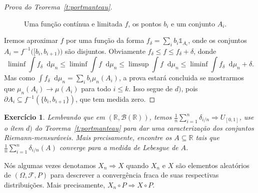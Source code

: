 \documentclass[reqno, final]{book}
\newcommand*\1{\mathds{1}}
\newtheorem{exercise}[example]{Exercício}
\renewcommand*\d{\mathop{}\!\mathrm{d}}
\begin{document}
\begin{proof}[Prova do Teorema~\ref{t:portmanteau}]
  \begin{figure}[!ht]
    \centering
    \caption{Uma função contínua e limitada $f$, os pontos $b_i$ e um conjunto $A_i$.}
  \end{figure}

  Iremos aproximar $f$ por uma função da forma $f_\delta = \sum_{i} b_i \1_{A_i}$, onde os conjuntos $A_i = f^{-1}\big( [b_i, b_{i+1}) \big)$ são disjuntos.
  Obviamente $f_\delta \leq f \leq f_\delta + \delta$, donde
  \begin{equation*}
    \liminf \int f_\delta \d \mu_n \leq \liminf \int f \d \mu_n \leq \limsup \int f \d \mu_n \leq \liminf \int f_\delta \d \mu_n + \delta.
  \end{equation*}
  Mas como $\int f_\delta \d \mu_n = \sum_i b_i \mu_n (A_i)$, a prova estará concluida se mostrarmos que $\mu_n (A_i) \to \mu(A_i)$ para todo $i \leq k$.
  Isso segue de $d)$, pois $\partial A_i \subseteq f^{-1}(\{b_i, b_{i+1}\})$, que tem medida zero.
\end{proof}

\begin{exercise}
  Lembrando que em $(\mathbb{R}, \mathcal{B}(\mathbb{R}))$, temos $\tfrac{1}{n} \sum_{i=1}^n \delta_{i/n} \Rightarrow U_{[0,1]}$, use o ítem $d)$ do Teorema~\ref{t:portmanteau} para dar uma caracterização dos conjuntos Riemann-mensuráveis.
  Mais precisamente, encontre os $A \subseteq \mathbb{R}$ tais que $\tfrac{1}{n} \sum_{i=1}^n \delta_{i/n}(A)$ converge para a medida de Lebesgue de $A$.
\end{exercise}

Nós algumas vezes denotamos $X_n \Rightarrow X$ quando $X_n$ e $X$ são elementos aleatórios de $(\Omega, \mathcal{F}, P)$ para descrever a convergência fraca de suas respectivas distribuições.
Mais precisamente, $X_n \circ P \Rightarrow X \circ P$.
\end{document}

